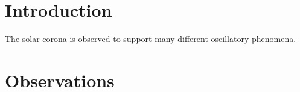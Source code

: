 \documentclass[manuscript]{../aastex52/aastex}
\begin{document}





\section{Introduction}

The solar corona is observed to support many different oscillatory
phenomena.



\section{Observations}
\end{document}
